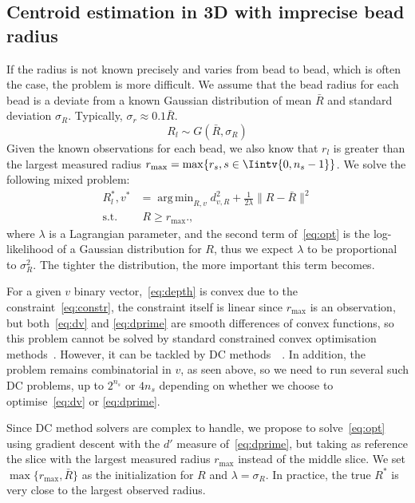 \documentclass{llncs}
\DeclareMathOperator*{\argmin}{arg\,min}
\begin{document}
\subsection{Centroid estimation in 3D with imprecise bead radius}
If the radius is not known precisely and varies from bead to bead, which is often the case, the problem is more difficult. We assume that the bead radius  for each bead is a deviate from a known Gaussian distribution of mean $\bar{R}$ and standard deviation $\sigma_R$. Typically, $\sigma_r \approx 0.1\bar{R}$.
\begin{equation}
R_l \sim G(\bar{R}, \sigma_R)
\end{equation}
Given the known observations for each bead, we also know that $r_l$ is greater than the largest measured radius $r_{\text{max}}=\max\{r_s, s\in \Iintv{0,n_s-1}\}$. We solve the following mixed problem:
\begin{align}
R^*_l,v^* &= \argmin_{R,v} d_{v,R}^2 + \frac{1}{2\lambda} \|R-\bar{R}\|^2 \label{eq:opt}\\
\text{s.t.}&\; R \geq r_{\text{max}}.\label{eq:constr},
\end{align}
where $\lambda$ is a Lagrangian parameter, and the second term of~\eqref{eq:opt} is the log-likelihood of a Gaussian distribution for $R$, thus we expect $\lambda$ to be proportional to $\sigma_R^2$. The tighter the distribution, the more important this term becomes.

For a given $v$ binary vector,~\eqref{eq:depth} is convex due to the constraint~\eqref{eq:constr}, the constraint itself is linear since $r_{\text{max}}$ is an observation, but both~\eqref{eq:dv} and \eqref{eq:dprime} are smooth differences of convex functions, so this problem cannot be solved by standard constrained convex optimisation methods~\cite{boyd2004convex}. However, it can be tackled by DC methods~~\cite{tao2005dc}. In addition, the problem remains combinatorial in $v$, as seen above, so we need to run several such DC problems, up to $2^{n_s}$ or $4n_s$ depending on whether we choose to optimise~\eqref{eq:dv} or \eqref{eq:dprime}. 

Since DC method solvers are complex to handle, we propose to solve~\eqref{eq:opt} using gradient descent with the $d'$ measure of~\eqref{eq:dprime}, but taking as reference the slice with the largest measured radius $r_{\max}$ instead of the middle slice. We set $\max\{r_{\max}, \bar{R}\}$ as the initialization for $R$ and $\lambda=\sigma_R$. In practice, the true $R^*$ is very close to the largest observed radius.
\end{document}
